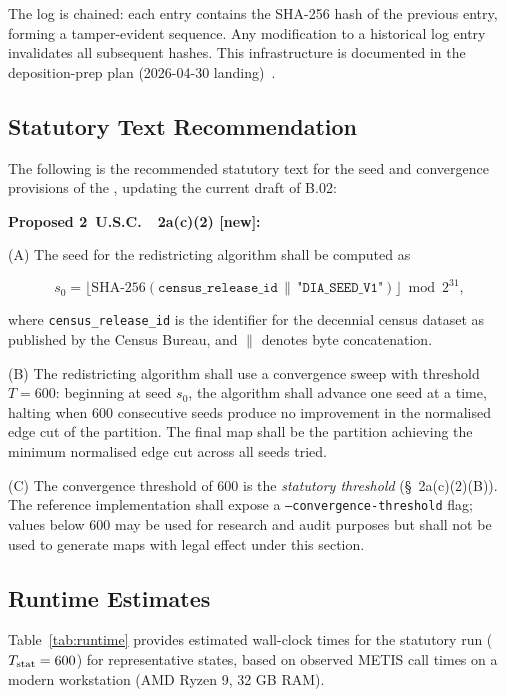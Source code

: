 The log is chained: each entry contains the SHA-256 hash of the previous
entry, forming a tamper-evident sequence.
Any modification to a historical log entry invalidates all subsequent hashes.
This infrastructure is documented in the deposition-prep plan
(2026-04-30 landing)~\citep{depoplan}.

\subsection{Statutory Text Recommendation}

The following is the recommended statutory text for the seed and convergence
provisions of the \dia{}, updating the current draft of B.02:

\begin{statute}
\textbf{Proposed 2~U.S.C.~\textsection~2a(c)(2) [new]:}

\medskip
\noindent
(A) The seed for the redistricting algorithm shall be computed as

\[
  s_0 = \bigl\lfloor
    \mathrm{SHA\text{-}256}(\mathtt{census\_release\_id}
      \,\|\, \texttt{"DIA\_SEED\_V1"})
  \bigr\rfloor \bmod 2^{31},
\]

where \texttt{census\_release\_id} is the identifier for the decennial census
dataset as published by the Census Bureau, and $\|$ denotes byte concatenation.

\medskip
\noindent
(B) The redistricting algorithm shall use a convergence sweep with threshold
$T = 600$: beginning at seed $s_0$, the algorithm shall advance one seed at a
time, halting when 600 consecutive seeds produce no improvement in the
normalised edge cut of the partition.
The final map shall be the partition achieving the minimum normalised edge cut
across all seeds tried.

\medskip
\noindent
(C) The convergence threshold of 600 is the \emph{statutory threshold}
(\S~2a(c)(2)(B)).
The reference implementation shall expose a \texttt{--convergence-threshold}
flag; values below 600 may be used for research and audit purposes but shall
not be used to generate maps with legal effect under this section.
\end{statute}

\subsection{Runtime Estimates}

Table~\ref{tab:runtime} provides estimated wall-clock times for the statutory
\cs{} run ($T_{\mathrm{stat}} = 600$) for representative states, based on observed METIS
call times on a modern workstation (AMD Ryzen 9, 32 GB RAM).

